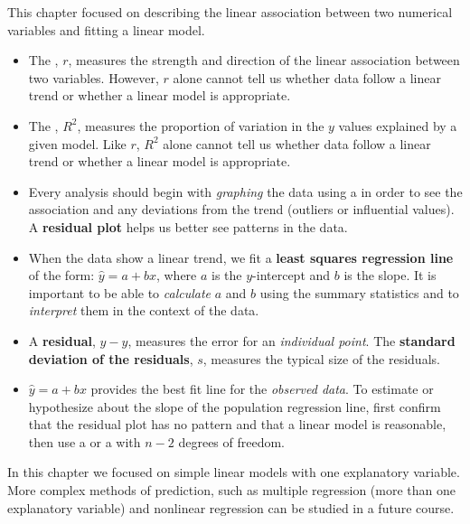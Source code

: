 {}


\reviewchapterheader{}

\noindent This chapter focused on describing the linear association between two numerical variables and fitting a linear model.  
\begin{itemize}
\item The , $r$, measures the strength and direction of the linear association between two variables.  However, $r$ alone cannot tell us whether data follow a linear trend or whether a linear model is appropriate.

\item The , $R^2$, measures the proportion of variation in the $y$ values explained by a given model.  Like $r$, $R^2$ alone cannot tell us whether data follow a linear trend or whether a linear model is appropriate.  

\item Every analysis should begin with \emph{graphing} the data using a  in order to see the association and any deviations from the trend (outliers or influential values).  A \textbf{residual plot} helps us better see patterns in the data.  

\item When the data show a linear trend, we fit a \textbf{least squares regression line} of the form: $\hat{y} = a+bx$, where $a$ is the $y$-intercept and $b$ is the slope.  It is important to be able to \emph{calculate} $a$ and $b$ using the summary statistics and to \emph{interpret} them in the context of the data.

\item A \textbf{residual}, $y-\hat{y}$, measures the error for an \emph{individual point}.  The \textbf{standard deviation of the residuals}, $s$, measures the typical size of the residuals.  

\item $\hat{y} = a+bx$ provides the best fit line for the \emph{observed data}.  To estimate or hypothesize about the slope of the population regression line, first confirm that the residual plot has no pattern and that a linear model is reasonable, then use a  or a  with $n-2$ degrees of freedom.
\end{itemize}
In this chapter we focused on simple linear models with one explanatory variable.  More complex methods of prediction, such as multiple regression (more than one explanatory variable) and nonlinear regression can be studied in a future course.


